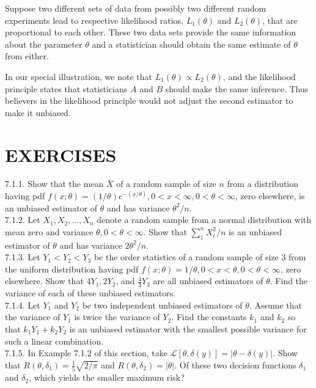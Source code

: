 Suppose two different sets of data from possibly two different random experiments lead to respective likelihood ratios, $L_{1}(\theta)$ and $L_{2}(\theta)$, that are proportional to each other. These two data sets provide the same information about the parameter $\theta$ and a statistician should obtain the same estimate of $\theta$ from either.

In our special illustration, we note that $L_{1}(\theta) \propto L_{2}(\theta)$, and the likelihood principle states that statisticians $A$ and $B$ should make the same inference. Thus believers in the likelihood principle would not adjust the second estimator to make it unbiased.

\section*{EXERCISES}
7.1.1. Show that the mean $\bar{X}$ of a random sample of size $n$ from a distribution having pdf $f(x ; \theta)=(1 / \theta) e^{-(x / \theta)}, 0<x<\infty, 0<\theta<\infty$, zero elsewhere, is an unbiased estimator of $\theta$ and has variance $\theta^{2} / n$.\\
7.1.2. Let $X_{1}, X_{2}, \ldots, X_{n}$ denote a random sample from a normal distribution with mean zero and variance $\theta, 0<\theta<\infty$. Show that $\sum_{1}^{n} X_{i}^{2} / n$ is an unbiased estimator of $\theta$ and has variance $2 \theta^{2} / n$.\\
7.1.3. Let $Y_{1}<Y_{2}<Y_{3}$ be the order statistics of a random sample of size 3 from the uniform distribution having pdf $f(x ; \theta)=1 / \theta, 0<x<\theta, 0<\theta<\infty$, zero elsewhere. Show that $4 Y_{1}, 2 Y_{2}$, and $\frac{4}{3} Y_{3}$ are all unbiased estimators of $\theta$. Find the variance of each of these unbiased estimators.\\
7.1.4. Let $Y_{1}$ and $Y_{2}$ be two independent unbiased estimators of $\theta$. Assume that the variance of $Y_{1}$ is twice the variance of $Y_{2}$. Find the constants $k_{1}$ and $k_{2}$ so that $k_{1} Y_{1}+k_{2} Y_{2}$ is an unbiased estimator with the smallest possible variance for such a linear combination.\\
7.1.5. In Example 7.1.2 of this section, take $\mathcal{L}[\theta, \delta(y)]=|\theta-\delta(y)|$. Show that $R\left(\theta, \delta_{1}\right)=\frac{1}{5} \sqrt{2 / \pi}$ and $R\left(\theta, \delta_{2}\right)=|\theta|$. Of these two decision functions $\delta_{1}$ and $\delta_{2}$, which yields the smaller maximum risk?\\
